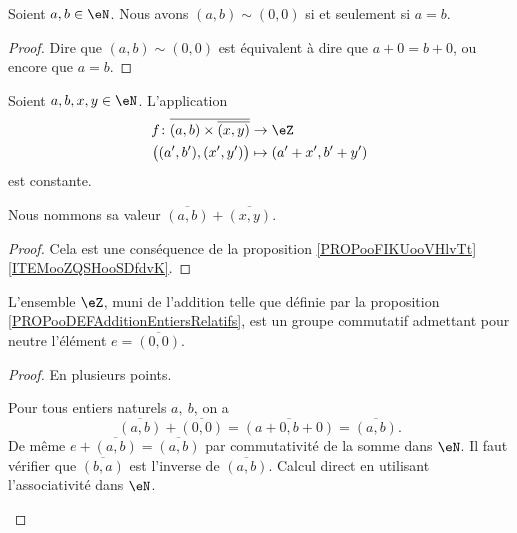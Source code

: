 \begin{lemma}	\label{LEMooEntiersEquivalentsZero}
	Soient \( a,b\in \eN\). Nous avons \( (a,b)\sim (0,0)\) si et seulement si \( a=b\).
\end{lemma}

\begin{proof}
	Dire que \( (a,b)\sim (0,0)\) est équivalent à dire que \( a+0=b+0\), ou encore que \( a=b\).
\end{proof}

\begin{propositionDef}	\label{PROPooDEFAdditionEntiersRelatifs}
	Soient \( a,b,x,y\in \eN\). L'application
	\begin{equation}
		\begin{aligned}
			f\colon \overline{ (a,b)\times \overline{ (x,y) } } & \to \eZ               \\
			\big( (a',b'),(x',y') \big)                         & \mapsto (a'+x',b'+y')
		\end{aligned}
	\end{equation}
	est constante.

	Nous nommons sa valeur \( \overline{ (a,b) }+\overline{ (x,y) }\).
\end{propositionDef}

\begin{proof}
	Cela est une conséquence de la proposition \ref{PROPooFIKUooVHlvTt}\ref{ITEMooZQSHooSDfdvK}.
\end{proof}

\begin{proposition}	\label{PROPooGroupeEntiersRelatifs}
	L'ensemble \( \eZ \), muni de l'addition telle que définie par la proposition \ref{PROPooDEFAdditionEntiersRelatifs}, est un groupe commutatif admettant pour neutre l'élément \( e = \overline{(0,0)} \).
\end{proposition}

\begin{proof}
	En plusieurs points.
	\begin{subproof}
		\spitem[Neutre]
		Pour tous entiers naturels \( a,\ b \), on a
		\begin{equation}
			\overline{ (a,b) }+\overline{ (0,0) }=\overline{ (a+0,b+0) }=\overline{ (a,b) }.
		\end{equation}
		De même \( e+\overline{ (a,b) }=\overline{ (a,b) }\) par commutativité de la somme dans \( \eN\).
		\spitem[Inverse]
		Il faut vérifier que \( \overline{ (b,a) }\) est l'inverse de \( \overline{ (a,b) }\).
		\spitem[Associativité]
		Calcul direct en utilisant l'associativité dans \( \eN\).
	\end{subproof}
\end{proof}

